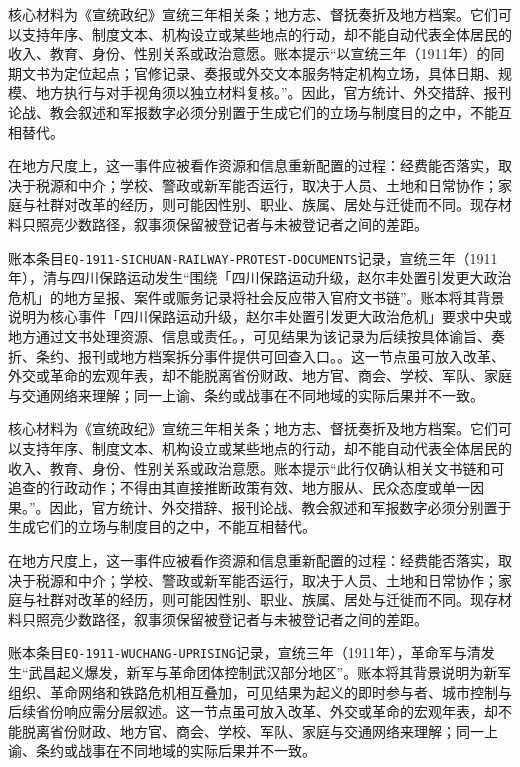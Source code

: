 核心材料为《宣统政纪》宣统三年相关条；地方志、督抚奏折及地方档案。它们可以支持年序、制度文本、机构设立或某些地点的行动，却不能自动代表全体居民的收入、教育、身份、性别关系或政治意愿。账本提示“以宣统三年（1911年）的同期文书为定位起点；官修记录、奏报或外交文本服务特定机构立场，具体日期、规模、地方执行与对手视角须以独立材料复核。”。因此，官方统计、外交措辞、报刊论战、教会叙述和军报数字必须分别置于生成它们的立场与制度目的之中，不能互相替代。

在地方尺度上，这一事件应被看作资源和信息重新配置的过程：经费能否落实，取决于税源和中介；学校、警政或新军能否运行，取决于人员、土地和日常协作；家庭与社群对改革的经历，则可能因性别、职业、族属、居处与迁徙而不同。现存材料只照亮少数路径，叙事须保留被登记者与未被登记者之间的差距。

账本条目\texttt{EQ-1911-SICHUAN-RAILWAY-PROTEST-DOCUMENTS}记录，宣统三年（1911年），清与四川保路运动发生“围绕「四川保路运动升级，赵尔丰处置引发更大政治危机」的地方呈报、案件或赈务记录将社会反应带入官府文书链”。账本将其背景说明为核心事件「四川保路运动升级，赵尔丰处置引发更大政治危机」要求中央或地方通过文书处理资源、信息或责任。，可见结果为该记录为后续按具体谕旨、奏折、条约、报刊或地方档案拆分事件提供可回查入口。。这一节点虽可放入改革、外交或革命的宏观年表，却不能脱离省份财政、地方官、商会、学校、军队、家庭与交通网络来理解；同一上谕、条约或战事在不同地域的实际后果并不一致。

核心材料为《宣统政纪》宣统三年相关条；地方志、督抚奏折及地方档案。它们可以支持年序、制度文本、机构设立或某些地点的行动，却不能自动代表全体居民的收入、教育、身份、性别关系或政治意愿。账本提示“此行仅确认相关文书链和可追查的行政动作；不得由其直接推断政策有效、地方服从、民众态度或单一因果。”。因此，官方统计、外交措辞、报刊论战、教会叙述和军报数字必须分别置于生成它们的立场与制度目的之中，不能互相替代。

在地方尺度上，这一事件应被看作资源和信息重新配置的过程：经费能否落实，取决于税源和中介；学校、警政或新军能否运行，取决于人员、土地和日常协作；家庭与社群对改革的经历，则可能因性别、职业、族属、居处与迁徙而不同。现存材料只照亮少数路径，叙事须保留被登记者与未被登记者之间的差距。

账本条目\texttt{EQ-1911-WUCHANG-UPRISING}记录，宣统三年（1911年），革命军与清发生“武昌起义爆发，新军与革命团体控制武汉部分地区”。账本将其背景说明为新军组织、革命网络和铁路危机相互叠加，可见结果为起义的即时参与者、城市控制与后续省份响应需分层叙述。这一节点虽可放入改革、外交或革命的宏观年表，却不能脱离省份财政、地方官、商会、学校、军队、家庭与交通网络来理解；同一上谕、条约或战事在不同地域的实际后果并不一致。

